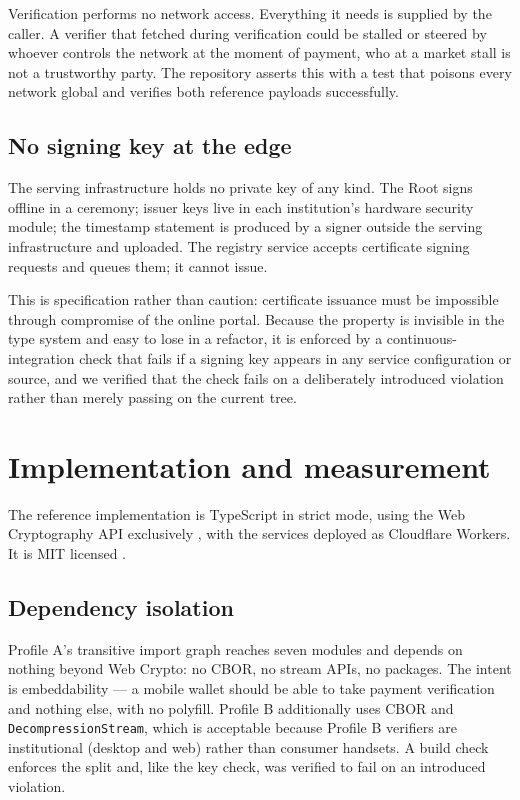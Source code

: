 \documentclass[10pt,a4paper,twocolumn]{article}
\newcommand{\code}[1]{\texttt{\small #1}}
\begin{document}
Verification performs no network access. Everything it needs is supplied by the
caller. A verifier that fetched during verification could be stalled or steered
by whoever controls the network at the moment of payment, who at a market stall
is not a trustworthy party. The repository asserts this with a test that
poisons every network global and verifies both reference payloads successfully.

\subsection{No signing key at the edge}

The serving infrastructure holds no private key of any kind. The Root signs
offline in a ceremony; issuer keys live in each institution's hardware security
module; the timestamp statement is produced by a signer outside the serving
infrastructure and uploaded. The registry service accepts certificate signing
requests and queues them; it cannot issue.

This is specification rather than caution: certificate issuance must be
impossible through compromise of the online portal. Because the property is
invisible in the type system and easy to lose in a refactor, it is enforced by a
continuous-integration check that fails if a signing key appears in any service
configuration or source, and we verified that the check fails on a deliberately
introduced violation rather than merely passing on the current tree.

\section{Implementation and measurement}
\label{sec:implementation}

The reference implementation is TypeScript in strict mode, using the Web
Cryptography API exclusively \citep{webcrypto}, with the services deployed as
Cloudflare Workers. It is MIT licensed \citep{khsqr2026repo}.

\subsection{Dependency isolation}

Profile A's transitive import graph reaches seven modules and depends on nothing
beyond Web Crypto: no CBOR, no stream APIs, no packages. The intent is
embeddability --- a mobile wallet should be able to take payment verification and
nothing else, with no polyfill. Profile B additionally uses CBOR and
\code{DecompressionStream}, which is acceptable because Profile B verifiers are
institutional (desktop and web) rather than consumer handsets. A build check
enforces the split and, like the key check, was verified to fail on an
introduced violation.
\end{document}
